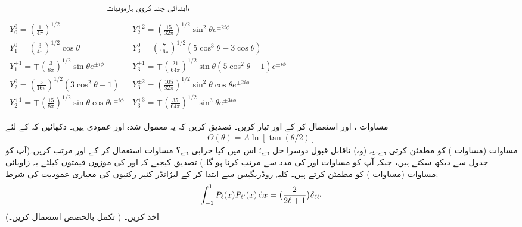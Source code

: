 \begin{table}
\caption{ابتدائی چند کروی ہارمونیات، }
\label{جدول_ابعادی_کروی_ہارمونیات}
\renewcommand{\arraystretch}{2} 
\centering
\begin{tabular}{ll}
$Y_0^0=(\frac{1}{4\pi})^{1/2}$ & $Y_2^{\pm 2}=(\frac{15}{32\pi})^{1/2}\sin^2\theta e^{\pm 2 i \phi}$\\
$Y_1^0=(\frac{3}{4\pi})^{1/2}\cos\theta$ & $Y_3^0=(\frac{7}{16\pi})^{1/2}(5\cos^3\theta-3\cos\theta)$\\
$Y_1^{\pm 1}=\mp(\frac{3}{8\pi})^{1/2}\sin\theta e^{\pm i\phi}$ & $Y_3^{\pm 1}=\mp(\frac{21}{64\pi})^{1/2}\sin\theta(5\cos^2\theta-1)e^{\pm i\phi}$\\
$Y_2^0=(\frac{5}{16\pi})^{1/2}(3\cos^2\theta-1)$ & $Y_3^{\pm 2}=(\frac{105}{32\pi})^{1/2}\sin^2\theta\cos\theta e^{\pm 2 i \phi}$\\
$Y_2^{\pm 1}=\mp(\frac{15}{8\pi})^{1/2}\sin\theta\cos\theta e^{\pm i\phi}$ & $Y_3^{\pm3}=\mp(\frac{35}{64\pi})^{1/2}\sin^3\theta e^{\pm 3 i \phi}$
\end{tabular}
\end{table}
مساوات ،  اور  استعمال 
کر کے  اور  تیار کریں۔ تصدیق کریں کہ یہ معمول شدہ اور عمودی ہیں۔
%
دکھائیں کہ  کے لئے
\begin{align*}
\Theta(\theta)=A\ln[\tan(\theta/2)] 
\end{align*}
 مساوات  (مساوات ) کو مطمئن کرتی ہے۔یہ (وہ) ناقابل قبول دوسرا حل ہے؛ اس میں کیا خرابی ہے؟
%
مساوات  استعمال کر کے  اور 
 مرتب کریں۔(آپ  کو جدول  سے دیکھ سکتے ہیں، جبکہ  آپ کو مساوات  اور  کی مدد سے مرتب کرنا ہو گا۔) تصدیق کیجیے کہ  اور  کی موزوں قیمتوں کیلئے یہ زاویائی مساوات (مساوات ) کو مطمئن کرتے ہیں۔
%
کلیہ روڈریگیس سے ابتدا کر کے لیژانڈر کثیر رکنیوں کی معیاری عمودیت کی شرط:
\begin{align}\label{مساوات_تین_عمودیت_لیژانڈر}
\int_{-1}^{1}P_{\ell}(x)P_{\ell'}(x)\dif x=\big(\frac{2}{2\ell+1}\big)\delta_{\ell\ell'} 
\end{align}
اخذ کریں۔ ( تکمل بالحصص استعمال کریں۔)


